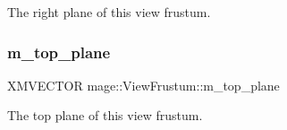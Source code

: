 The right plane of this view frustum. \hypertarget{structmage_1_1_view_frustum_a82076a48eaa7ed305a0a1c43246f93d4}{}\label{structmage_1_1_view_frustum_a82076a48eaa7ed305a0a1c43246f93d4} 
\subsubsection{\texorpdfstring{m\+\_\+top\+\_\+plane}{m\_top\_plane}}
{\footnotesize\ttfamily X\+M\+V\+E\+C\+T\+OR mage\+::\+View\+Frustum\+::m\+\_\+top\+\_\+plane}

The top plane of this view frustum. 